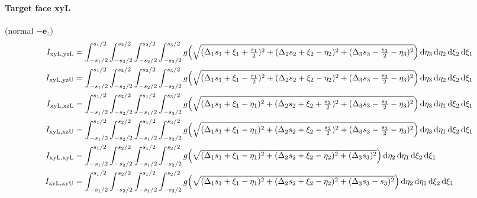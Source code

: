 \paragraph{Target face xyL} (normal $-\mathbf{e}_z$)
\begin{align*}
I_{\mathrm{xyL},\mathrm{yzL}} &= \int_{-s_1/2}^{s_1/2}\int_{-s_2/2}^{s_2/2}\int_{-s_2/2}^{s_2/2}\int_{-s_3/2}^{s_3/2} g\Bigl(\sqrt{(\Delta_1 s_1 + \xi_1 + \tfrac{s_1}{2})^2 + (\Delta_2 s_2 + \xi_2 - \eta_2)^2 + (\Delta_3 s_3 - \tfrac{s_3}{2} - \eta_3)^2}\Bigr)\,\mathrm{d}\eta_3\,\mathrm{d}\eta_2\,\mathrm{d}\xi_2\,\mathrm{d}\xi_1 \\I_{\mathrm{xyL},\mathrm{yzU}} &= \int_{-s_1/2}^{s_1/2}\int_{-s_2/2}^{s_2/2}\int_{-s_2/2}^{s_2/2}\int_{-s_3/2}^{s_3/2} g\Bigl(\sqrt{(\Delta_1 s_1 + \xi_1 - \tfrac{s_1}{2})^2 + (\Delta_2 s_2 + \xi_2 - \eta_2)^2 + (\Delta_3 s_3 - \tfrac{s_3}{2} - \eta_3)^2}\Bigr)\,\mathrm{d}\eta_3\,\mathrm{d}\eta_2\,\mathrm{d}\xi_2\,\mathrm{d}\xi_1 \\I_{\mathrm{xyL},\mathrm{xzL}} &= \int_{-s_1/2}^{s_1/2}\int_{-s_2/2}^{s_2/2}\int_{-s_1/2}^{s_1/2}\int_{-s_3/2}^{s_3/2} g\Bigl(\sqrt{(\Delta_1 s_1 + \xi_1 - \eta_1)^2 + (\Delta_2 s_2 + \xi_2 + \tfrac{s_2}{2})^2 + (\Delta_3 s_3 - \tfrac{s_3}{2} - \eta_3)^2}\Bigr)\,\mathrm{d}\eta_3\,\mathrm{d}\eta_1\,\mathrm{d}\xi_2\,\mathrm{d}\xi_1 \\I_{\mathrm{xyL},\mathrm{xzU}} &= \int_{-s_1/2}^{s_1/2}\int_{-s_2/2}^{s_2/2}\int_{-s_1/2}^{s_1/2}\int_{-s_3/2}^{s_3/2} g\Bigl(\sqrt{(\Delta_1 s_1 + \xi_1 - \eta_1)^2 + (\Delta_2 s_2 + \xi_2 - \tfrac{s_2}{2})^2 + (\Delta_3 s_3 - \tfrac{s_3}{2} - \eta_3)^2}\Bigr)\,\mathrm{d}\eta_3\,\mathrm{d}\eta_1\,\mathrm{d}\xi_2\,\mathrm{d}\xi_1 \\I_{\mathrm{xyL},\mathrm{xyL}} &= \int_{-s_1/2}^{s_1/2}\int_{-s_2/2}^{s_2/2}\int_{-s_1/2}^{s_1/2}\int_{-s_2/2}^{s_2/2} g\Bigl(\sqrt{(\Delta_1 s_1 + \xi_1 - \eta_1)^2 + (\Delta_2 s_2 + \xi_2 - \eta_2)^2 + (\Delta_3 s_3)^2}\Bigr)\,\mathrm{d}\eta_2\,\mathrm{d}\eta_1\,\mathrm{d}\xi_2\,\mathrm{d}\xi_1 \\I_{\mathrm{xyL},\mathrm{xyU}} &= \int_{-s_1/2}^{s_1/2}\int_{-s_2/2}^{s_2/2}\int_{-s_1/2}^{s_1/2}\int_{-s_2/2}^{s_2/2} g\Bigl(\sqrt{(\Delta_1 s_1 + \xi_1 - \eta_1)^2 + (\Delta_2 s_2 + \xi_2 - \eta_2)^2 + (\Delta_3 s_3 - s_3)^2}\Bigr)\,\mathrm{d}\eta_2\,\mathrm{d}\eta_1\,\mathrm{d}\xi_2\,\mathrm{d}\xi_1
\end{align*}

